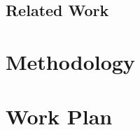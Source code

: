 \documentclass[11pt]{article}
\begin{document}
	\subsection{Related Work}
	\label{subsec:RelatedWork}
	

\section{Methodology}
\label{sec:Methodology}


\section{Work Plan}
\label{sec:WorkPlan}




\end{document}
